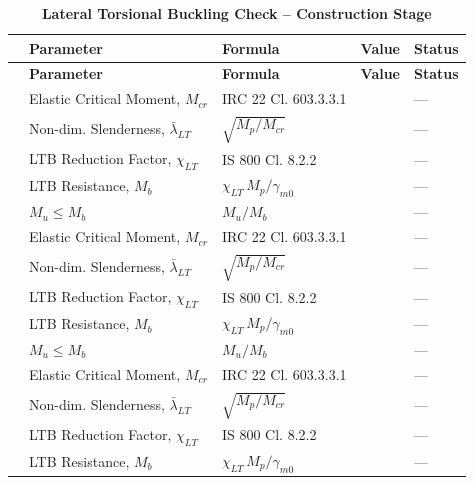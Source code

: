 \documentclass[12pt,a4paper]{report}
\numberwithin{table}{chapter}
\numberwithin{figure}{chapter}
\newcommand{\reportrowpad}{4pt}
\newcommand{\reportsectiongap}{0.75em}
\begin{document}
\vspace{\reportsectiongap}
\begin{longtable}{|C{2.5cm}|C{3.5cm}|C{3.5cm}|>{\centering\arraybackslash}p{4.2cm}|C{1.8cm}|}
\caption{\textbf{Lateral Torsional Buckling Check -- Construction Stage}}\\
\hline
\textbf{} & \textbf{Parameter} & \textbf{Formula} & \textbf{Value} & \textbf{Status} \\[\reportrowpad]
\hline
\endfirsthead
\hline
\textbf{} & \textbf{Parameter} & \textbf{Formula} & \textbf{Value} & \textbf{Status} \\[\reportrowpad]
\hline
\endhead
{} & Elastic Critical Moment, $M_{cr}$ & IRC 22 Cl. 603.3.3.1 &  & --- \\[\reportrowpad]
 & Non-dim. Slenderness, $\bar{\lambda}_{LT}$ & $\sqrt{M_p / M_{cr}}$ &  & --- \\[\reportrowpad]
 & LTB Reduction Factor, $\chi_{LT}$ & IS 800 Cl. 8.2.2 &  & --- \\[\reportrowpad]
 & LTB Resistance, $M_b$ & $\chi_{LT}\,M_p / \gamma_{m0}$ &  & --- \\[\reportrowpad]
 & $M_u \leq M_b$ & $M_u / M_b$ &  & --- \\[\reportrowpad]
\hline
{} & Elastic Critical Moment, $M_{cr}$ & IRC 22 Cl. 603.3.3.1 &  & --- \\[\reportrowpad]
 & Non-dim. Slenderness, $\bar{\lambda}_{LT}$ & $\sqrt{M_p / M_{cr}}$ &  & --- \\[\reportrowpad]
 & LTB Reduction Factor, $\chi_{LT}$ & IS 800 Cl. 8.2.2 &  & --- \\[\reportrowpad]
 & LTB Resistance, $M_b$ & $\chi_{LT}\,M_p / \gamma_{m0}$ &  & --- \\[\reportrowpad]
 & $M_u \leq M_b$ & $M_u / M_b$ &  & --- \\[\reportrowpad]
\hline
{} & Elastic Critical Moment, $M_{cr}$ & IRC 22 Cl. 603.3.3.1 &  & --- \\[\reportrowpad]
 & Non-dim. Slenderness, $\bar{\lambda}_{LT}$ & $\sqrt{M_p / M_{cr}}$ &  & --- \\[\reportrowpad]
 & LTB Reduction Factor, $\chi_{LT}$ & IS 800 Cl. 8.2.2 &  & --- \\[\reportrowpad]
 & LTB Resistance, $M_b$ & $\chi_{LT}\,M_p / \gamma_{m0}$ &  & --- \\[\reportrowpad]

\end{longtable}
\end{document}
